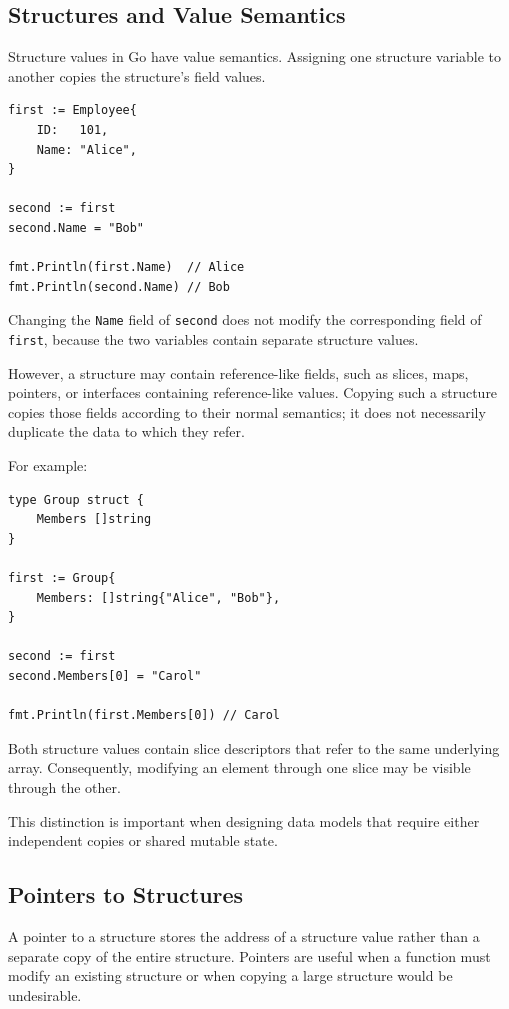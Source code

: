 \subsection{Structures and Value Semantics}

Structure values in Go have value semantics. Assigning one structure variable to another copies the structure's field values.

\begin{lstlisting}
first := Employee{
    ID:   101,
    Name: "Alice",
}

second := first
second.Name = "Bob"

fmt.Println(first.Name)  // Alice
fmt.Println(second.Name) // Bob
\end{lstlisting}

Changing the \texttt{Name} field of \texttt{second} does not modify the corresponding field of \texttt{first}, because the two variables contain separate structure values.

However, a structure may contain reference-like fields, such as slices, maps, pointers, or interfaces containing reference-like values. Copying such a structure copies those fields according to their normal semantics; it does not necessarily duplicate the data to which they refer.

For example:

\begin{lstlisting}
type Group struct {
    Members []string
}

first := Group{
    Members: []string{"Alice", "Bob"},
}

second := first
second.Members[0] = "Carol"

fmt.Println(first.Members[0]) // Carol
\end{lstlisting}

Both structure values contain slice descriptors that refer to the same underlying array. Consequently, modifying an element through one slice may be visible through the other.

This distinction is important when designing data models that require either independent copies or shared mutable state.

\subsection{Pointers to Structures}

A pointer to a structure stores the address of a structure value rather than a separate copy of the entire structure. Pointers are useful when a function must modify an existing structure or when copying a large structure would be undesirable.

